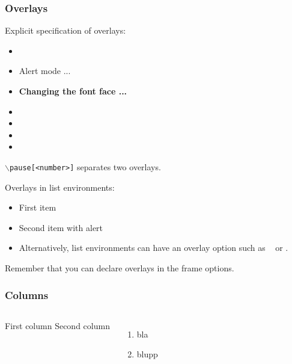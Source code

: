 \begin{frame}
  \frametitle{Overlays}
  {\small 

    Explicit specification of overlays:
    \begin{itemize}
    \item {}
    \item \alert<3>{Alert mode ...} 
    \item \textbf<4>{Changing the font face ...}
    \item {} 
    \item {}
    \item {}
    \item {}
    \end{itemize}

    \vfill
    {\tt $\backslash$pause[<number>]} separates two overlays.

    \vfill
    Overlays in list environments:
    \begin{itemize}
    \item<9-> First item
    \item<alert@10> Second item with alert
    \item Alternatively, list environments can have an overlay option such as {\tt <+-> } or {\tt <+- alert@ +>}.
    \end{itemize}

    \vfill
    Remember that you can declare overlays in the frame options.
    \hyperlink{frameoptions}{}

  }
\end{frame}
\begin{frame}
  \frametitle{Columns}

  \begin{columns}
    First column
		Second column
    \begin{enumerate}
    \item bla
    \item blupp
    \end{enumerate}
  \end{columns}

\end{frame}
